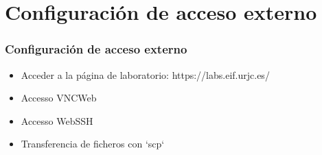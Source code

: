 \section{Configuración de acceso externo}

\begin{frame}
\frametitle{Configuración de acceso externo}

\begin{itemize}
	\item Acceder a la página de laboratorio: https://labs.eif.urjc.es/
	\item Accesso VNCWeb
	\item Accesso WebSSH
	\item Transferencia de ficheros con `scp`
\end{itemize}

\end{frame}
